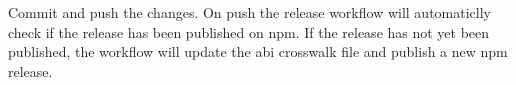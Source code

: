 \begin{DoxyCode}{0}

\end{DoxyCode}



\begin{DoxyEnumerate}
\item Commit and push the changes. On push the release workflow will automaticlly check if the release has been published on npm. If the release has not yet been published, the workflow will update the abi crosswalk file and publish a new npm release. 
\end{DoxyEnumerate}